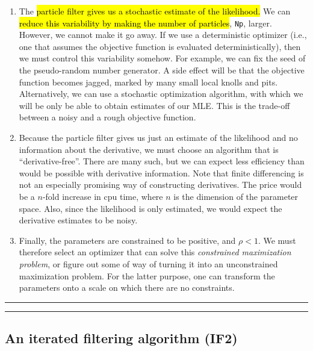 \documentclass[]{article}
\begin{document}
\begin{enumerate}
\def\labelenumi{\arabic{enumi}.}
\item
  The \hl{particle filter gives us a stochastic estimate of the likelihood.}
  We can \hl{reduce this variability by making the number of particles},
  \texttt{Np}, larger. However, we cannot make it go away. If we use a
  deterministic optimizer (i.e., one that assumes the objective function
  is evaluated deterministically), then we must control this variability
  somehow. For example, we can fix the seed of the pseudo-random number
  generator. A side effect will be that the objective function becomes
  jagged, marked by many small local knolls and pits. Alternatively, we
  can use a stochastic optimization algorithm, with which we will be
  only be able to obtain estimates of our MLE. This is the trade-off
  between a noisy and a rough objective function.
\item
  Because the particle filter gives us just an estimate of the
  likelihood and no information about the derivative, we must choose an
  algorithm that is ``derivative-free''. There are many such, but we can
  expect less efficiency than would be possible with derivative
  information. Note that finite differencing is not an especially
  promising way of constructing derivatives. The price would be a
  \(n\)-fold increase in cpu time, where \(n\) is the dimension of the
  parameter space. Also, since the likelihood is only estimated, we
  would expect the derivative estimates to be noisy.
\item
  Finally, the parameters are constrained to be positive, and
  \(\rho < 1\). We must therefore select an optimizer that can solve
  this \emph{constrained maximization problem}, or figure out some of
  way of turning it into an unconstrained maximization problem. For the
  latter purpose, one can transform the parameters onto a scale on which
  there are no constraints.
\end{enumerate}

\begin{center}\rule{0.5\linewidth}{\linethickness}\end{center}

\begin{center}\rule{0.5\linewidth}{\linethickness}\end{center}

\subsection{An iterated filtering algorithm
(IF2)}\label{an-iterated-filtering-algorithm-if2}
\end{document}
